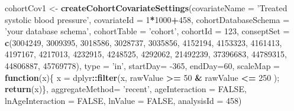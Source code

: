 \documentclass[
]{article}
\newenvironment{Shaded}{\begin{snugshade}}{\end{snugshade}}
\newcommand{\ControlFlowTok}[1]{\textcolor[rgb]{0.13,0.29,0.53}{\textbf{#1}}}
\newcommand{\DataTypeTok}[1]{\textcolor[rgb]{0.13,0.29,0.53}{#1}}
\newcommand{\DecValTok}[1]{\textcolor[rgb]{0.00,0.00,0.81}{#1}}
\newcommand{\KeywordTok}[1]{\textcolor[rgb]{0.13,0.29,0.53}{\textbf{#1}}}
\newcommand{\NormalTok}[1]{#1}
\newcommand{\OperatorTok}[1]{\textcolor[rgb]{0.81,0.36,0.00}{\textbf{#1}}}
\newcommand{\OtherTok}[1]{\textcolor[rgb]{0.56,0.35,0.01}{#1}}
\newcommand{\StringTok}[1]{\textcolor[rgb]{0.31,0.60,0.02}{#1}}
\begin{document}
\begin{Shaded}
\begin{Highlighting}[]
\NormalTok{cohortCov1 <-}\StringTok{ }\KeywordTok{createCohortCovariateSettings}\NormalTok{(}\DataTypeTok{covariateName =} \StringTok{'Treated systolic blood pressure'}\NormalTok{,}
                                            \DataTypeTok{covariateId =} \DecValTok{1}\OperatorTok{*}\DecValTok{1000}\OperatorTok{+}\DecValTok{458}\NormalTok{,}
                                            \DataTypeTok{cohortDatabaseSchema =} \StringTok{'your database schema'}\NormalTok{,}
                                            \DataTypeTok{cohortTable =} \StringTok{'cohort'}\NormalTok{,}
                                            \DataTypeTok{cohortId =} \DecValTok{123}\NormalTok{,}
                                            \DataTypeTok{conseptSet =} \KeywordTok{c}\NormalTok{(}\DecValTok{3004249}\NormalTok{, }\DecValTok{3009395}\NormalTok{, }\DecValTok{3018586}\NormalTok{, }\DecValTok{3028737}\NormalTok{, }\DecValTok{3035856}\NormalTok{, }\DecValTok{4152194}\NormalTok{, }\DecValTok{4153323}\NormalTok{, }\DecValTok{4161413}\NormalTok{, }\DecValTok{4197167}\NormalTok{, }\DecValTok{4217013}\NormalTok{, }\DecValTok{4232915}\NormalTok{, }\DecValTok{4248525}\NormalTok{, }\DecValTok{4292062}\NormalTok{, }\DecValTok{21492239}\NormalTok{, }\DecValTok{37396683}\NormalTok{, }\DecValTok{44789315}\NormalTok{, }\DecValTok{44806887}\NormalTok{, }\DecValTok{45769778}\NormalTok{),}
                                            \DataTypeTok{type =} \StringTok{'in'}\NormalTok{,}
                                            \DataTypeTok{startDay=} \DecValTok{-365}\NormalTok{, }
                                            \DataTypeTok{endDay=}\DecValTok{60}\NormalTok{,}
                                            \DataTypeTok{scaleMap =} \ControlFlowTok{function}\NormalTok{(x)\{ x =}\StringTok{ }\NormalTok{dplyr}\OperatorTok{::}\KeywordTok{filter}\NormalTok{(x, rawValue }\OperatorTok{>=}\StringTok{ }\DecValTok{50} \OperatorTok{&}\StringTok{ }\NormalTok{rawValue }\OperatorTok{<=}\StringTok{ }\DecValTok{250}\NormalTok{ ); }\KeywordTok{return}\NormalTok{(x)\},}
                                            \DataTypeTok{aggregateMethod=} \StringTok{'recent'}\NormalTok{, }
                                            \DataTypeTok{ageInteraction =} \OtherTok{FALSE}\NormalTok{,}
                                            \DataTypeTok{lnAgeInteraction =} \OtherTok{FALSE}\NormalTok{,}
                                            \DataTypeTok{lnValue =} \OtherTok{FALSE}\NormalTok{,}
                                            \DataTypeTok{analysisId =} \DecValTok{458}\NormalTok{)}
\end{Highlighting}
\end{Shaded}
\end{document}
